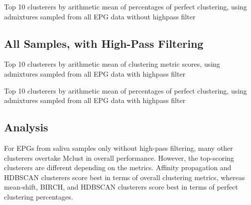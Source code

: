 \begin{table}[H]
\centering
{}
\caption{Top 10 clusterers by arithmetic mean of percentages of perfect clustering, using admixtures sampled from all EPG data without highpass filter}
\label{table:top_10_not_ensemble_clusterers_by_binomial_confidence_highpass_0-sampleids_all-nruns_1000}
\end{table}

\subsection{All Samples, with High-Pass Filtering}

\begin{table}[H]
\centering
{}
\caption{Top 10 clusterers by arithmetic mean of clustering metric scores, using admixtures sampled from all EPG data with highpass filter}
\label{table:top_10_not_ensemble_clusterers_by_metrics_highpass_71-sampleids_all-nruns_1000}
\end{table}

\begin{table}[H]
\centering
{}
\caption{Top 10 clusterers by arithmetic mean of percentages of perfect clustering, using admixtures sampled from all EPG data with highpass filter}
\label{table:top_10_not_ensemble_clusterers_by_binomial_confidence_highpass_71-sampleids_all-nruns_1000}
\end{table}

\subsection{Analysis}

For EPGs from saliva samples only without high-pass filtering, many other clusterers overtake Mclust in overall performance. However, the top-scoring clusterers are different depending on the metrics. Affinity propagation and HDBSCAN clusterers score best in terms of overall clustering metrics, whereas mean-shift, BIRCH, and HDBSCAN clusterers score best in terms of perfect clustering percentages. 


